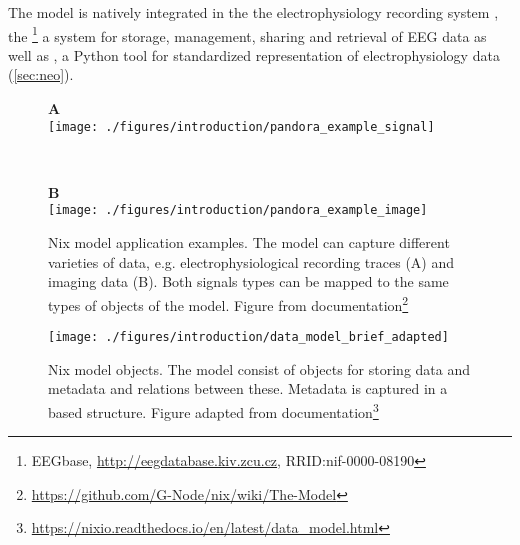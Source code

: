 The  model is natively integrated in the the electrophysiology recording system , the \footnote{EEGbase, \url{http://eegdatabase.kiv.zcu.cz}, RRID:nif-0000-08190} a system for storage, management, sharing and retrieval of EEG data as well as , a Python tool for standardized representation of electrophysiology data (\ref{sec:neo}).


\begin{figure}
 \centering
 \begin{minipage}[t]{0.8\textwidth}
 \textbf{A}\newline\\
 \hfill\texttt{[image: ./figures/introduction/pandora\_example\_signal]}
 \end{minipage}\\
 \vspace{1cm}
 \begin{minipage}[t]{0.8\textwidth}
 \textbf{B}\newline\\
 \hfill\texttt{[image: ./figures/introduction/pandora\_example\_image]}
 \end{minipage}
 \caption[Nix model application examples]{Nix model application examples. The model can capture different varieties of data, e.g. electrophysiological recording traces (A) and imaging data (B). Both signals types can be mapped to the same types of objects of the  model. Figure from  documentation\footnote{\url{https://github.com/G-Node/nix/wiki/The-Model}}}
 \label{fig:intro_nix_examples}
\end{figure}

\begin{figure}
 \texttt{[image: ./figures/introduction/data\_model\_brief\_adapted]}
 \caption[Nix model objects]{Nix model objects. The model consist of objects for storing data and metadata and relations between these. Metadata is captured in a  based structure. Figure adapted from  documentation\footnote{\url{https://nixio.readthedocs.io/en/latest/data_model.html}}}
 \label{fig:intro_nix_model}
\end{figure}

